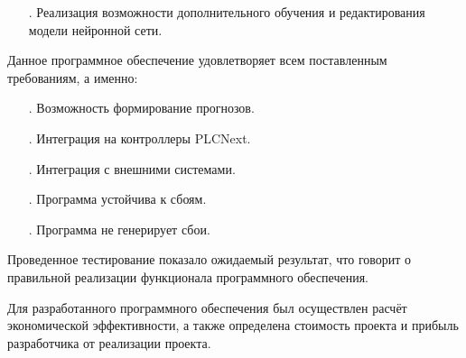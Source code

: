 {\begin{itemize}[leftmargin=2.15cm, labelwidth=0.65cm, labelsep=0.0cm]
		\item[\theitemcntr.] Реализация возможности дополнительного обучения и редактирования модели нейронной сети.		
		\addtocounter{itemcntr}{1}

		\setcounter{itemcntr}{1}
	\end{itemize} 

	\par \redline Данное программное обеспечение удовлетворяет всем поставленным требованиям, а именно:
	
	\begin{itemize}[leftmargin=2.15cm, labelwidth=0.65cm, labelsep=0.0cm] 
		
		\item[\theitemcntr.] Возможность формирование прогнозов.	
		\addtocounter{itemcntr}{1}
		
		\item[\theitemcntr.] Интеграция на контроллеры PLCNext.		
		\addtocounter{itemcntr}{1}
		
		\item[\theitemcntr.] Интеграция с внешними системами. 		
		\addtocounter{itemcntr}{1}
		
		\item[\theitemcntr.] Программа устойчива к сбоям.		
		\addtocounter{itemcntr}{1}
		
		\item[\theitemcntr.] Программа не генерирует сбои.		
		\addtocounter{itemcntr}{1}
		
		\setcounter{itemcntr}{1}
	\end{itemize}  
	  
	\par \redline Проведенное тестирование показало ожидаемый результат, что говорит о правильной реализации функционала программного обеспечения. 

	\par \redline Для разработанного программного обеспечения был осуществлен расчёт экономической эффективности, а также определена стоимость проекта и прибыль разработчика от реализации проекта.
	
}

\setcounter{subchaptercntr}{1}
\setcounter{formulacntr}{1}
\setcounter{imagecntr}{1}